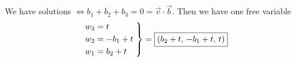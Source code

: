 \documentclass[../main.tex]{subfiles}
\begin{document}
\begin{example}[]
    We have solutions \( \iff b_1 + b_2 + b_3 = 0 = \vec{v} \cdot \vec{b} \).
    Then we have one free variable
    \[ \left.\kern-\nulldelimiterspace
        \begin{aligned}
            w_3 &= t \\
            w_2 & = -b_1 + t \\
            w_1 &= b_2 + t
        \end{aligned} \;
    \right\} = \boxed{\left( b_2 + t, \, -b_1+t, \, t \right)}
    \]
\end{example}
\end{document}
